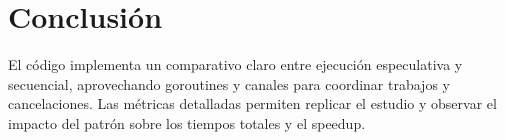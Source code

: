 \documentclass[11pt]{article}
\begin{document}
\section{Conclusión}
El código implementa un comparativo claro entre ejecución especulativa y secuencial, aprovechando goroutines y canales para coordinar trabajos y cancelaciones. Las métricas detalladas permiten replicar el estudio y observar el impacto del patrón sobre los tiempos totales y el speedup.
\end{document}
